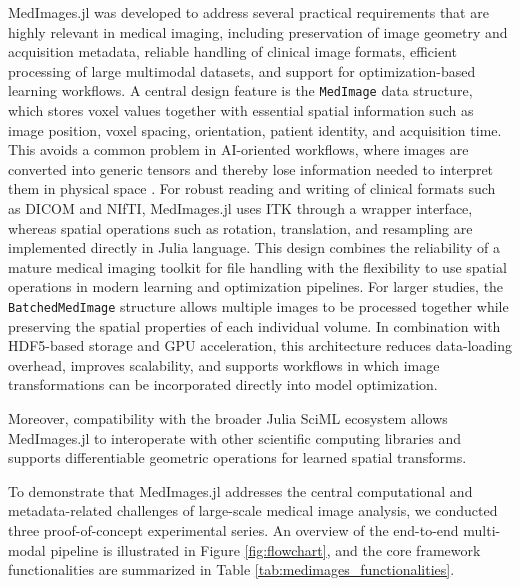 \documentclass[a4paper,10pt]{elsarticle}
\begin{document}
MedImages.jl was developed to address several practical requirements that are highly relevant in medical imaging, including preservation of image geometry and acquisition metadata, reliable handling of clinical image formats, efficient processing of large multimodal datasets, and support for optimization-based learning workflows. 
A central design feature is the \verb|MedImage| data structure, which stores voxel values together with essential spatial information such as image position, voxel spacing, orientation, patient identity, and acquisition time. This avoids a common problem in AI-oriented workflows, where images are converted into generic tensors and thereby lose information needed to interpret them in physical space \cite{}. 
For robust reading and writing of clinical formats such as DICOM and NIfTI, MedImages.jl uses ITK through a wrapper interface, whereas spatial operations such as rotation, translation, and resampling are implemented directly in Julia language. This design combines the reliability of a mature medical imaging toolkit for file handling with the flexibility to use spatial operations in modern learning and optimization pipelines. 
For larger studies, the \verb|BatchedMedImage| structure allows multiple images to be processed together while preserving the spatial properties of each individual volume. In combination with HDF5-based storage and GPU acceleration, this architecture reduces data-loading overhead, improves scalability, and supports workflows in which image transformations can be incorporated directly into model optimization.  

Moreover, compatibility with the broader Julia SciML ecosystem allows MedImages.jl to interoperate with other scientific computing libraries and supports differentiable geometric operations for learned spatial transforms.  

To demonstrate that MedImages.jl addresses the central computational and metadata-related challenges of large-scale medical image analysis, we conducted three proof-of-concept experimental series. An overview of the end-to-end multi-modal pipeline is illustrated in Figure \ref{fig:flowchart}, and the core framework functionalities are summarized in Table \ref{tab:medimages_functionalities}.
\end{document}
